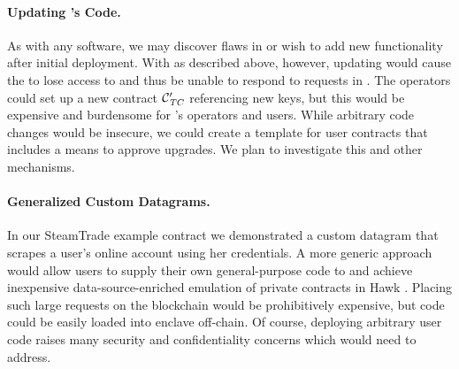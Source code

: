 \paragraph{Updating \tc's Code.}
As with any software, we may discover flaws in \tc or wish to add new functionality after initial deployment.
With \tc as described above, however, updating \engine would cause the \encname to lose access to \skTC and thus be unable to respond to requests in \tcont.
The \tc operators could set up a new contract $\tcont'$ referencing new keys, but this would be expensive and burdensome for \tc's operators and users.
While arbitrary code changes would be insecure, we could create a template for user contracts that includes a means to approve upgrades.
We plan to investigate this and other mechanisms.

\paragraph{Generalized Custom Datagrams.}
In our {\sf SteamTrade} example contract we demonstrated a custom datagram that scrapes a user's online account using her credentials.
A more generic approach would allow users to supply their own general-purpose code to \tc and achieve inexpensive data-source-enriched emulation of private contracts in Hawk \cite{hawk}.
Placing such large requests on the blockchain would be prohibitively expensive, but code could be easily loaded into \tc enclave off-chain.
Of course, deploying arbitrary user code raises many security and confidentiality concerns which \tc would need to address.

